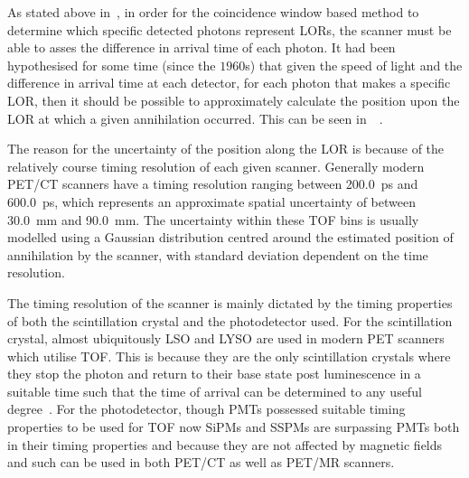                 As stated above in~, in order for the coincidence window based method to determine which specific detected photons represent \glspl{LOR}, the scanner must be able to asses the difference in arrival time of each photon. %
                It had been hypothesised for some time (since the $1960$s) that given the speed of light and the difference in arrival time at each detector, for each photon that makes a specific \gls{LOR}, then it should be possible to approximately calculate the position upon the \gls{LOR} at which a given annihilation occurred. %
                This can be seen in~~\parencite{Surti2015, TOFPhotodetectorsBib}.
                
                The reason for the uncertainty of the position along the \gls{LOR} is because of the relatively course timing resolution of each given scanner. Generally modern \gls{PET}/\gls{CT} scanners have a timing resolution ranging between \SI{200.0}{\pico\second} and \SI{600.0}{\pico\second}, which represents an approximate spatial uncertainty of between \SI{30.0}{\milli\metre} and \SI{90.0}{\milli\metre}. %
                The uncertainty within these \gls{TOF} bins is usually modelled using a Gaussian distribution centred around the estimated position of annihilation by the scanner, with standard deviation dependent on the time resolution.
                
                The timing resolution of the scanner is mainly dictated by the timing properties of both the scintillation crystal and the photodetector used. For the scintillation crystal, almost ubiquitously \gls{LSO} and \gls{LYSO} are used in modern \gls{PET} scanners which utilise \gls{TOF}. This is because they are the only scintillation crystals where they stop the photon and return to their base state post luminescence in a suitable time such that the time of arrival can be determined to any useful degree~\parencite{TOFLSOBib}. For the photodetector, though \glspl{PMT} possessed suitable timing properties to be used for \gls{TOF} now \glspl{SiPM} and \glspl{SSPM} are surpassing \glspl{PMT} both in their timing properties and because they are not affected by magnetic fields and such can be used in both \gls{PET}/\gls{CT} as well as \gls{PET}/\gls{MR} scanners.
                
